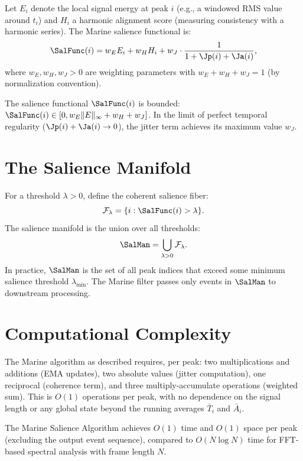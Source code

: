 Let $E_i$ denote the local signal energy at peak $i$
(e.g., a windowed RMS value around $t_i$) and $H_i$
a harmonic alignment score (measuring consistency with
a harmonic series). The Marine salience functional is:
\[
  \SalFunc(i) = w_E E_i + w_H H_i
  + w_J \cdot \frac{1}{1 + \Jp(i) + \Ja(i)},
\]
where $w_E, w_H, w_J > 0$ are weighting parameters
with $w_E + w_H + w_J = 1$ (by normalization convention).

\begin{proposition}
The salience functional $\SalFunc(i)$ is bounded:
$\SalFunc(i) \in [0, w_E \|E\|_\infty + w_H + w_J]$.
In the limit of perfect temporal regularity
($\Jp(i) + \Ja(i) \to 0$), the jitter term achieves
its maximum value $w_J$.
\end{proposition}

\section{The Salience Manifold}
\label{app-b:salience-manifold}

For a threshold $\lambda > 0$, define the coherent
salience fiber:
\[
  \mathcal{F}_\lambda = \{i : \SalFunc(i) > \lambda\}.
\]
The salience manifold is the union over all thresholds:
\[
  \SalMan = \bigcup_{\lambda > 0} \mathcal{F}_\lambda.
\]
In practice, $\SalMan$ is the set of all peak indices
that exceed some minimum salience threshold $\lambda_{\min}$.
The Marine filter passes only events in $\SalMan$
to downstream processing.

\section{Computational Complexity}
\label{app-b:complexity}

The Marine algorithm as described requires, per peak:
two multiplications and additions (EMA updates),
two absolute values (jitter computation), one reciprocal
(coherence term), and three multiply-accumulate operations
(weighted sum). This is $O(1)$ operations per peak,
with no dependence on the signal length or any global
state beyond the running averages $\bar{T}_i$ and
$\bar{A}_i$.

\begin{proposition}
The Marine Salience Algorithm achieves $O(1)$
time and $O(1)$ space per peak (excluding the output
event sequence), compared to $O(N \log N)$ time for
FFT-based spectral analysis with frame length $N$.
\end{proposition}

